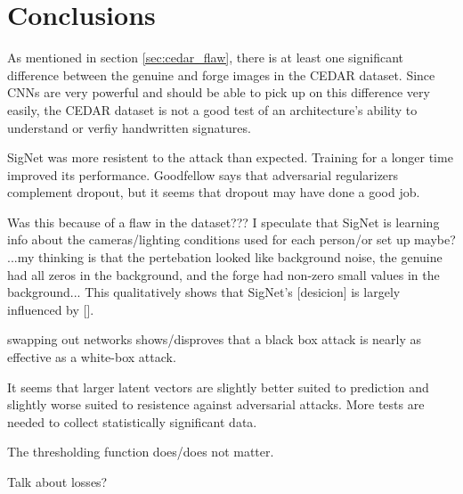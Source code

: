 \section{Conclusions}\label{sec:conclusion}

As mentioned in section \ref{sec:cedar_flaw}, there is at least one significant difference between the genuine and forge images in the CEDAR dataset.
Since CNNs are very powerful and should be able to pick up on this difference very easily, the CEDAR dataset is not a good test of an architecture's ability to understand or verfiy handwritten signatures.

SigNet was more resistent to the attack than expected.
Training for a longer time improved its performance.
Goodfellow says that adversarial regularizers complement dropout, but it seems that dropout may have done a good job.

Was this because of a flaw in the dataset???
I speculate that SigNet is learning info about the cameras/lighting conditions used for each person/or set up maybe?
...my thinking is that the pertebation looked like background noise, the genuine had all zeros in the background, and the forge had non-zero small values in the background...
This qualitatively shows that SigNet's [desicion] is largely influenced by [].

swapping out networks shows/disproves that a black box attack is nearly as effective as a white-box attack.

It seems that larger latent vectors are slightly better suited to prediction and slightly worse suited to resistence against adversarial attacks.
More tests are needed to collect statistically significant data.

The thresholding function does/does not matter.

Talk about losses?

